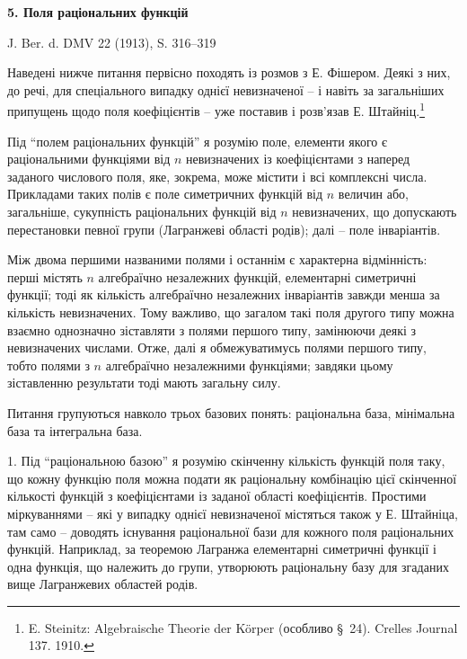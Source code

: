 \documentclass[11pt]{article}
\begin{document}
\begin{center}
{\Large\bfseries 5. Поля раціональних функцій}\par
\vspace{1.2em}
J. Ber. d. DMV 22 (1913), S. 316--319
\end{center}

\vspace{2em}

Наведені нижче питання первісно походять із розмов з Е. Фішером. Деякі з них, до речі, для спеціального випадку однієї невизначеної -- і навіть за загальніших припущень щодо поля коефіцієнтів -- уже поставив і розв'язав Е. Штайніц.\footnote{E. Steinitz: Algebraische Theorie der Körper (особливо \S\ 24). Crelles Journal 137. 1910.}

Під ``полем раціональних функцій'' я розумію поле, елементи якого є раціональними функціями від $n$ невизначених із коефіцієнтами з наперед заданого числового поля, яке, зокрема, може містити і всі комплексні числа. Прикладами таких полів є поле симетричних функцій від $n$ величин або, загальніше, сукупність раціональних функцій від $n$ невизначених, що допускають перестановки певної групи (Лагранжеві області родів); далі -- поле інваріантів.

Між двома першими названими полями і останнім є характерна відмінність: перші містять $n$ алгебраїчно незалежних функцій, елементарні симетричні функції; тоді як кількість алгебраїчно незалежних інваріантів завжди менша за кількість невизначених. Тому важливо, що загалом такі поля другого типу можна взаємно однозначно зіставляти з полями першого типу, замінюючи деякі з невизначених числами. Отже, далі я обмежуватимусь полями першого типу, тобто полями з $n$ алгебраїчно незалежними функціями; завдяки цьому зіставленню результати тоді мають загальну силу.

Питання групуються навколо трьох базових понять: раціональна база, мінімальна база та інтегральна база.

1. Під ``раціональною базою'' я розумію скінченну кількість функцій поля таку, що кожну функцію поля можна подати як раціональну комбінацію цієї скінченної кількості функцій з коефіцієнтами із заданої області коефіцієнтів. Простими міркуваннями -- які у випадку однієї невизначеної містяться також у Е. Штайніца, там само -- доводять існування раціональної бази для кожного поля раціональних функцій. Наприклад, за теоремою Лагранжа елементарні симетричні функції і одна функція, що належить до групи, утворюють раціональну базу для згаданих вище Лагранжевих областей родів.
\end{document}
